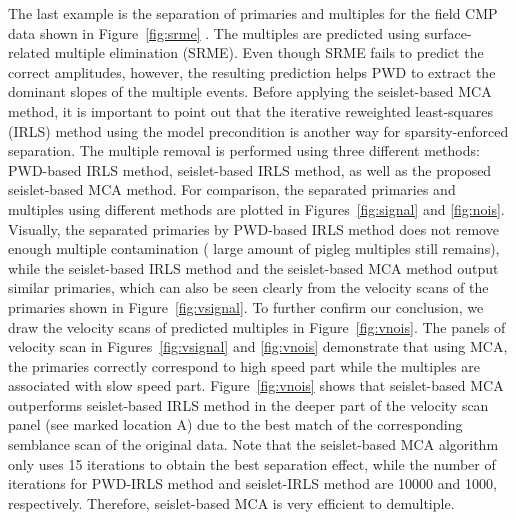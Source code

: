The last example is the separation of primaries and multiples for the field CMP data shown in Figure~\ref{fig:srme} \citep{fomel2006regularizing}. The multiples are predicted using surface-related multiple elimination (SRME). Even though SRME fails to predict the correct amplitudes, however, the resulting prediction helps PWD to extract the dominant slopes of the multiple events. 
Before applying the seislet-based MCA method, it is important to point out that the iterative reweighted least-squares (IRLS) method using the model precondition is another way for sparsity-enforced separation. The multiple removal is performed using three different methods: PWD-based IRLS method, seislet-based IRLS method, as well as the proposed seislet-based MCA method. For comparison, the separated primaries and multiples using different methods are plotted in Figures~\ref{fig:signal} and \ref{fig:nois}. Visually, the separated primaries by PWD-based IRLS method does not remove enough multiple contamination ( large amount of pigleg multiples still remains), while the seislet-based IRLS method and the seislet-based MCA method output similar primaries, which can also be seen clearly from the velocity scans of the primaries shown in Figure~\ref{fig:vsignal}. To further confirm our conclusion, we draw the velocity scans of predicted multiples in Figure~\ref{fig:vnois}. The panels of velocity scan in Figures~\ref{fig:vsignal} and \ref{fig:vnois} demonstrate that using MCA, the primaries correctly correspond to high speed part while the multiples are associated with slow speed part. Figure~\ref{fig:vnois} shows that seislet-based MCA outperforms seislet-based IRLS method in the deeper part of the velocity scan panel (see marked location A) due to the best match of the corresponding semblance scan of the original data. Note that the seislet-based MCA algorithm only uses 15 iterations to obtain the best separation effect, while the number of iterations for PWD-IRLS method and seislet-IRLS method are 10000 and 1000, respectively. Therefore, seislet-based MCA is very efficient to demultiple.


